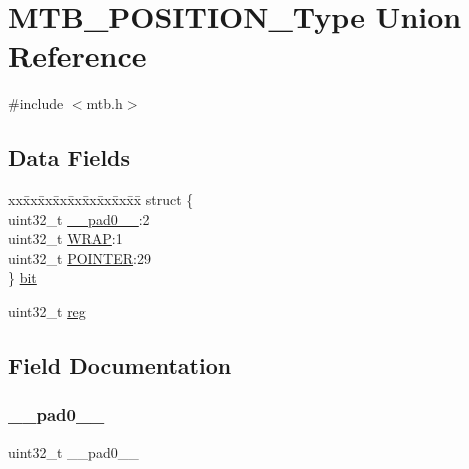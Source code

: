 \hypertarget{union_m_t_b___p_o_s_i_t_i_o_n___type}{}\section{M\+T\+B\+\_\+\+P\+O\+S\+I\+T\+I\+O\+N\+\_\+\+Type Union Reference}
\label{union_m_t_b___p_o_s_i_t_i_o_n___type}


{\ttfamily \#include $<$mtb.\+h$>$}

\subsection*{Data Fields}
\begin{DoxyCompactItemize}
\item 
\begin{tabbing}
xx\=xx\=xx\=xx\=xx\=xx\=xx\=xx\=xx\=\kill
struct \{\\
\>uint32\_t \mbox{\hyperlink{union_m_t_b___p_o_s_i_t_i_o_n___type_a3e57c2ef1c3ffb36722f000cc1156824}{\_\_pad0\_\_}}:2\\
\>uint32\_t \mbox{\hyperlink{union_m_t_b___p_o_s_i_t_i_o_n___type_a418c724bbd7d956209b2a4bc6e019b93}{WRAP}}:1\\
\>uint32\_t \mbox{\hyperlink{union_m_t_b___p_o_s_i_t_i_o_n___type_a65a01145059b5889aba2e53ac953c082}{POINTER}}:29\\
\} \mbox{\hyperlink{union_m_t_b___p_o_s_i_t_i_o_n___type_a3f792c8aa94dbfaf274cfefc78354ead}{bit}}\\

\end{tabbing}\item 
uint32\+\_\+t \mbox{\hyperlink{union_m_t_b___p_o_s_i_t_i_o_n___type_a6b91636401516a477989a336376d7b40}{reg}}
\end{DoxyCompactItemize}


\subsection{Field Documentation}
\mbox{\label{union_m_t_b___p_o_s_i_t_i_o_n___type_a3e57c2ef1c3ffb36722f000cc1156824}} 
\subsubsection{\texorpdfstring{\_\_pad0\_\_}{\_\_pad0\_\_}}
{\footnotesize\ttfamily uint32\+\_\+t \+\_\+\+\_\+pad0\+\_\+\+\_\+}

